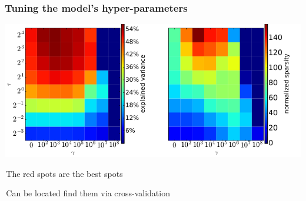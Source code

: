 \documentclass{beamer}
\def\mydot{\structure{\rule{1ex}{1ex}}\,}
\begin{document}
\begin{frame}
  \frametitle{{Tuning the model's hyper-parameters}}%
  \bigskip
  \bigskip
  \includegraphics[width=1.\linewidth]{cv.png}
  \bigskip
  
  \mydot{The red spots are the best spots}

  \bigskip
  
  \mydot{Can be located find them via cross-validation}
\end{frame}  
\end{document}

